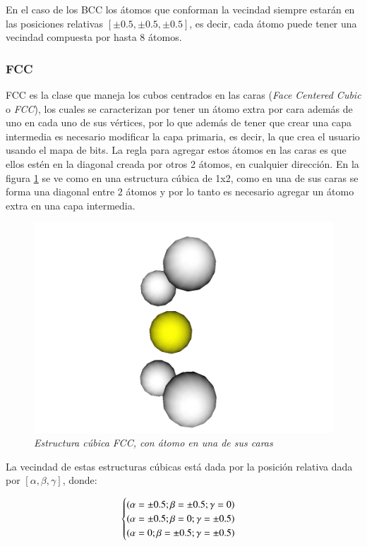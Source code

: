 En el caso de los BCC los átomos que conforman la vecindad siempre estarán en las posiciones relativas $[\pm 0.5, \pm 0.5, \pm 0.5]$, es decir, cada átomo puede tener una vecindad compuesta por hasta 8 átomos.

\subsubsection{FCC}
FCC es la clase que maneja los cubos centrados en las caras (\emph{Face Centered Cubic} o \emph{FCC}), los cuales se caracterizan por tener un átomo extra por cara además de uno en cada uno de sus vértices, por lo que además de tener que crear una capa intermedia es necesario modificar la capa primaria, es decir, la que crea el usuario usando el mapa de bits. La regla para agregar estos átomos en las caras es que ellos estén en la diagonal creada por otros 2 átomos, en cualquier dirección. En la figura \ref{FCC-diagonal} se ve como en una estructura cúbica de 1x2, como en una de sus caras se forma una diagonal entre 2 átomos y por lo tanto es necesario agregar un átomo extra en una capa intermedia.

\begin{figure}[ht]
  \centering
  \includegraphics[scale=.3]{images/FCC-diagonal}
  \caption{\em Estructura cúbica FCC, con átomo en una de sus caras}
  \label{FCC-diagonal}
\end{figure}

La vecindad de estas estructuras cúbicas está dada por la posición relativa dada por $[\alpha, \beta, \gamma]$, donde:

\[
	\begin{cases}
		$$(\alpha = \pm 0.5; \beta = \pm 0.5; \gamma = 0)$$ \\
		$$(\alpha = \pm 0.5; \beta = 0; \gamma = \pm 0.5)$$ \\
		$$(\alpha = 0; \beta = \pm 0.5; \gamma = \pm 0.5)$$
	\end{cases}
\]

